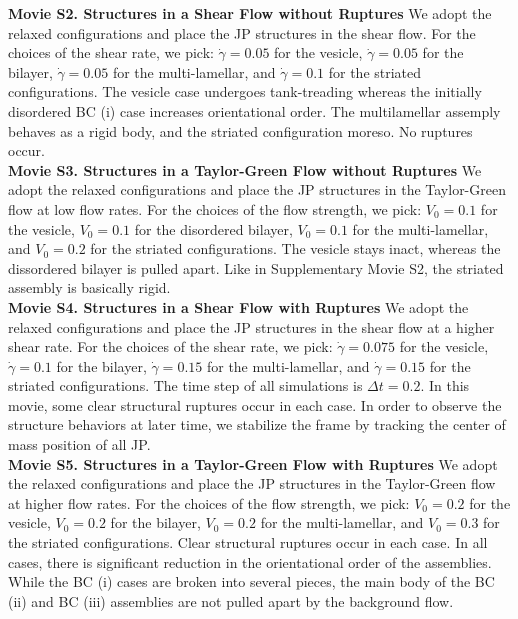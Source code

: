 \noindent
{\bf Movie S2. Structures in a Shear Flow without Ruptures} 
We adopt the relaxed configurations and place the JP structures in the
shear flow. For the choices of the shear rate, we pick: $\dot\gamma =
0.05$ for the vesicle, $\dot\gamma = 0.05$ for the bilayer, $\dot\gamma
= 0.05$ for the multi-lamellar, and $\dot\gamma = 0.1$ for the striated
configurations. The vesicle case undergoes tank-treading whereas the
initially disordered BC (i) case increases orientational order. The
multilamellar assemply behaves as a rigid body, and the striated
configuration moreso. No ruptures occur. \\



\noindent
{\bf Movie S3. Structures in a Taylor-Green Flow without Ruptures} 
We adopt the relaxed configurations and place the JP structures in the
Taylor-Green flow at low flow rates. For the choices of the flow
strength, we pick: $V_0 = 0.1$ for the vesicle, $V_0 = 0.1$ for the
disordered bilayer, $V_0 = 0.1$ for the multi-lamellar, and $V_0 = 0.2$
for the striated configurations. The vesicle stays inact, whereas the
dissordered bilayer is pulled apart. Like in Supplementary Movie S2, the
striated assembly is basically rigid. \\


\noindent
{\bf Movie S4. Structures in a Shear Flow with Ruptures} 
We adopt the relaxed configurations and place the JP structures in the
shear flow at a higher shear rate. For the choices of the shear rate, we
pick: $\dot\gamma = 0.075$ for the vesicle, $\dot\gamma = 0.1$ for the
bilayer, $\dot\gamma = 0.15$ for the multi-lamellar, and $\dot\gamma =
0.15$ for the striated configurations. The time step of all simulations
is $\Delta t=0.2$. In this movie, some clear structural ruptures occur
in each case. In order to observe the structure behaviors at later time,
we stabilize the frame by tracking the center of mass position of all
JP. \\


\noindent
{\bf Movie S5. Structures in a Taylor-Green Flow with Ruptures} 
We adopt the relaxed configurations and place the JP structures in the
Taylor-Green flow at higher flow rates. For the choices of the flow
strength, we pick: $V_0 = 0.2$ for the vesicle, $V_0 = 0.2$ for the
bilayer, $V_0 = 0.2$ for the multi-lamellar, and $V_0 = 0.3$ for the
striated configurations. Clear structural ruptures occur in each case.
In all cases, there is significant reduction in the orientational order
of the assemblies. While the BC (i) cases are broken into several
pieces, the main body of the BC (ii) and BC (iii) assemblies are not
pulled apart by the background flow.

